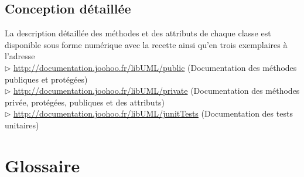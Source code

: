 \documentclass[12pt,a4paper,openany]{report}
\begin{document}
	\section{Conception détaillée}
	La description détaillée des méthodes et des attributs de chaque classe est disponible sous forme numérique
	avec la recette ainsi qu'en trois exemplaires à l'adresse \\
	$\rhd$ \url{http://documentation.joohoo.fr/libUML/public} (Documentation des méthodes publiques et protégées)\\
	$\rhd$ \url{http://documentation.joohoo.fr/libUML/private} (Documentation des méthodes privée, protégées, pu\-bliques et des attributs)\\
	$\rhd$ \url{http://documentation.joohoo.fr/libUML/junitTests} (Documentation des tests unitaires)
	
	\appendix
	\closeout\glossaireVar
	\chapter{Glossaire}
	\begin{sortedlist}
		
	\end{sortedlist}
\end{document}
